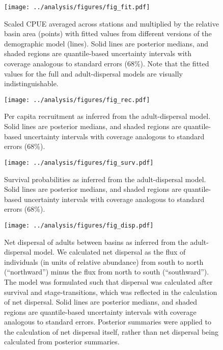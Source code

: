 \documentclass[11pt]{article}
\begin{document}
\newpage{}
\begin{figure}
\centering
\texttt{[image: ../analysis/figures/fig\_fit.pdf]}
\caption{\label{fig:fit}
Scaled CPUE averaged across stations and multiplied by the relative basin area (points)
with fitted values from different versions of the demographic model (lines).
Solid lines are posterior medians,
and shaded regions are quantile-based uncertainty intervals
with coverage analogous to standard errors (68\%).
Note that the fitted values for the full and adult-dispersal models 
are visually indistinguishable.
}
\end{figure}
\clearpage{}

\newpage{}
\begin{figure}
\centering
\texttt{[image: ../analysis/figures/fig\_rec.pdf]}
\caption{\label{fig:rec}
Per capita recruitment as inferred from the adult-dispersal model.
Solid lines are posterior medians,
and shaded regions are quantile-based uncertainty intervals
with coverage analogous to standard errors (68\%).
}
\end{figure}
\clearpage{}

\newpage{}
\begin{figure}
\centering
\texttt{[image: ../analysis/figures/fig\_surv.pdf]}
\caption{\label{fig:surv}
Survival probabilities as inferred from the adult-dispersal model.
Solid lines are posterior medians,
and shaded regions are quantile-based uncertainty intervals
with coverage analogous to standard errors (68\%).
}
\end{figure}
\clearpage{}

\newpage{}
\begin{figure}
\centering
\texttt{[image: ../analysis/figures/fig\_disp.pdf]}
\caption{\label{fig:disp}
Net dispersal of adults between basins as inferred from the adult-dispersal model.
We calculated net dispersal as the flux of individuals (in units of relative abundance)
from south to north (``northward'') minus the flux from north to south (``southward'').
The model was formulated such that dispersal was calculated after survival and stage-transitions,
which was reflected in the calculation of net dispersal.
Solid lines are posterior medians,
and shaded regions are quantile-based uncertainty intervals
with coverage analogous to standard errors.
Posterior summaries were applied to the calculation of net dispersal itself,
rather than net dispersal being calculated from posterior summaries.
}
\end{figure}
\clearpage{}
\end{document}
